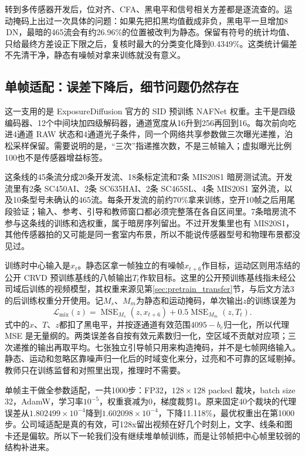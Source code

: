 \documentclass[11pt,a4paper,UTF8,fontset=fandol]{ctexart}
\newcommand{\dn}{\ensuremath{\,\mathrm{DN}}}
\begin{document}
转到多传感器开发后，位对齐、CFA、黑电平和信号相关方差都是逐流查的。运动掩码上出过一次具体的问题：如果先把扣黑均值截成非负，黑电平一旦增加8\dn{}，最暗的465流会有约26.96\%的位置被改判为静态。保留有符号的统计均值、只给最终方差设正下限之后，复核时最大的分类变化降到0.4349\%。这类统计偏差不先清干净，静态有噪帧对拿来训练就没有意义。

\subsection{单帧适配：误差下降后，细节问题仍然存在}

这一支用的是 ExposureDiffusion 官方的 SID 预训练 NAFNet 权重。主干是四级编码器、12个中间块加四级解码器，通道宽度从16升到256再回到16。每次前向吃进4通道 RAW 状态和4通道光子条件，同一个网络共享参数做三次曝光递推，泊松采样保留。需要说明的是，“三次”指递推次数，不是三帧输入；虚拟曝光比例100也不是传感器增益标签。

这条线的45条流分成20条开发流、18条标定流和7条 MIS20S1 暗房测试流。开发流里有2条 SC450AI、2条 SC635HAI、2条 SC465SL、4条 MIS20S1 室外流，以及10条型号未确认的465流。每条开发流的前约70\%拿来训练，空开10帧之后用尾段验证；输入、参考、引导和教师窗口都必须完整落在各自区间里。7条暗房流不参与这条线的训练和选权重，属于暗房序列留出。不过开发集里也有 MIS20S1，其他传感器拍的又可能是同一套室内布景，所以不能说传感器型号和物理布景都没见过。

训练时中心输入是$x_t$。静态区拿一帧独立的有噪帧$x_{t+6}$作目标，运动区则用冻结的公开 CRVD 预训练基线的八帧输出$T_t$作软目标。这里的公开预训练基线指未经公司域后训练的视频模型，其权重来源见第\ref{sec:pretrain_transfer}节，与后文方法3的后训练权重分开使用。记$M_s$、$M_m$为静态和运动掩码，单次输出$z$的训练误差为
\begin{equation}
 \mathcal L_{\mathrm{mix}}(z)=
 \operatorname{MSE}_{M_s}(z,x_{t+6})
 +0.5\operatorname{MSE}_{M_m}(z,T_t).
 \label{eq:djc_mix}
\end{equation}
式中的$x$、$T$、$z$都扣了黑电平，并按逐通道有效范围$4095-b_c$归一化，所以代理 MSE 是无量纲的。两类误差各自按有效元素数归一化，空区域不贡献对应项；三次递推的输出再取平均。七张独立引导帧只用来构造掩码，并不是七帧网络输入。静态、运动和忽略区靠噪声归一化后的时域变化来分，过亮和不可靠的区域剔掉。教师只在训练监督和对照里出现，推理时不需要。

单帧主干做全参数适配，一共1000步：FP32，$128\times128$ packed 裁块，batch size 32，AdamW，学习率$10^{-5}$，权重衰减为0，梯度裁剪1。原来固定40个裁块的代理误差从$1.802499\times10^{-4}$降到$1.602098\times10^{-4}$，下降11.118\%，最优权重出在第1000步。公司域适配是真的有效，可128x留出视频在好几个时刻上，文字、线条和图卡还是偏软。所以下一轮我们没有继续堆单帧训练，而是让邻帧把中心帧里较弱的结构补进来。
\end{document}
